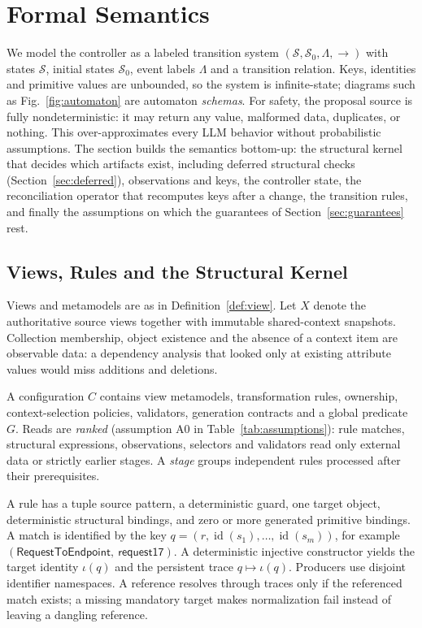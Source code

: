 \section{Formal Semantics}\label{sec:semantics}
We model the controller as a labeled transition system $(\mathcal S,\mathcal S_0,\Lambda,\to)$ with states $\mathcal S$, initial states $\mathcal S_0$, event labels $\Lambda$ and a transition relation. Keys, identities and primitive values are unbounded, so the system is infinite-state; diagrams such as Fig.~\ref{fig:automaton} are automaton \emph{schemas}. For safety, the proposal source is fully nondeterministic: it may return any value, malformed data, duplicates, or nothing. This over-approximates every LLM behavior without probabilistic assumptions. The section builds the semantics bottom-up: the structural kernel that decides which artifacts exist, including deferred structural checks (Section~\ref{sec:deferred}), observations and keys, the controller state, the reconciliation operator that recomputes keys after a change, the transition rules, and finally the assumptions on which the guarantees of Section~\ref{sec:guarantees} rest.

\subsection{Views, Rules and the Structural Kernel}
Views and metamodels are as in Definition~\ref{def:view}. Let $X$ denote the authoritative source views together with immutable shared-context snapshots. Collection membership, object existence and the absence of a context item are observable data: a dependency analysis that looked only at existing attribute values would miss additions and deletions.

A configuration $C$ contains view metamodels, transformation rules, ownership, context-selection policies, validators, generation contracts and a global predicate $G$. Reads are \emph{ranked} (assumption A0 in Table~\ref{tab:assumptions}): rule matches, structural expressions, observations, selectors and validators read only external data or strictly earlier stages. A \emph{stage} groups independent rules processed after their prerequisites.

A rule has a tuple source pattern, a deterministic guard, one target object, deterministic structural bindings, and zero or more generated primitive bindings. A match is identified by the key $q=(r,\operatorname{id}(s_1),\ldots,\operatorname{id}(s_m))$, for example $(\mathsf{RequestToEndpoint},\ \mathsf{request17})$. A deterministic injective constructor yields the target identity $\iota(q)$ and the persistent trace $q\mapsto\iota(q)$. Producers use disjoint identifier namespaces. A reference resolves through traces only if the referenced match exists; a missing mandatory target makes normalization fail instead of leaving a dangling reference.

